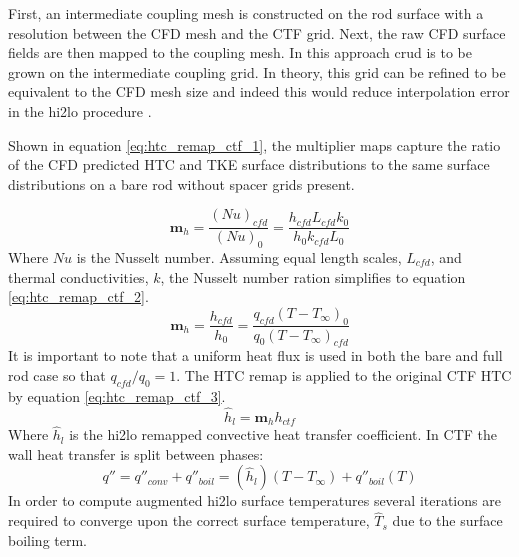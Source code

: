     First, an intermediate coupling mesh is constructed on the rod surface with a resolution between the CFD mesh and the CTF grid.  Next, the raw CFD surface fields are then mapped to the coupling mesh.  In this approach crud is to be grown on the intermediate coupling grid.  In theory, this grid can be refined to be equivalent to the CFD mesh size and indeed this would reduce interpolation error in the hi2lo procedure \cite{salko17}.
       
    Shown in equation \ref{eq:htc_remap_ctf_1},  the multiplier maps capture the ratio of the CFD predicted HTC and TKE surface distributions to the same surface distributions on a bare rod without spacer grids present.
    
    \begin{equation}
        \mathbf m_h = \frac{(Nu)_{cfd}}{(Nu)_{0}} = \frac{h_{cfd} L_{cfd} k_{0} }{h_{0}k_{cfd} L_{0}}
         \label{eq:htc_remap_ctf_1}
    \end{equation}
    Where $Nu$ is the Nusselt number.  Assuming equal length scales, $L_{cfd}$, and thermal conductivities, $k$, the Nusselt number ration simplifies to equation \ref{eq:htc_remap_ctf_2}.
    \begin{equation}
        \mathbf m_h = \frac{h_{cfd}}{h_{0}} = \frac{q_{cfd}(T-T_\infty)_{0}}{q_{0}(T-T_\infty)_{cfd}}
        \label{eq:htc_remap_ctf_2}
    \end{equation}
    It is important to note that a uniform heat flux is used in both the bare and full rod case so that $q_{cfd}/q_0 =1 $.
    The HTC remap is applied to the original CTF HTC by equation \ref{eq:htc_remap_ctf_3}.
    \begin{equation}
        \hat h_{l} = \mathbf m_h h_{ctf}
        \label{eq:htc_remap_ctf_3}
    \end{equation}
    Where $\hat h_l$ is the hi2lo remapped convective heat transfer coefficient.  In CTF the wall heat transfer is split between phases:
    \begin{equation}
        q'' = q''_{conv} + q''_{boil} = (\hat h_l)(T-T_{\infty}) + q''_{boil}(T)
    \end{equation}
    In order to compute augmented hi2lo surface temperatures
    several iterations are required to converge upon the correct surface temperature, $\hat T_s$ due to the surface boiling term.


